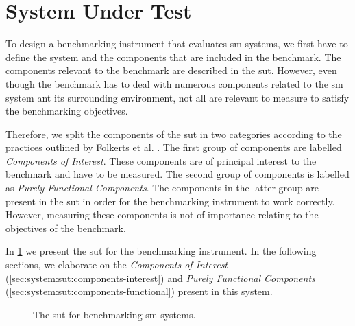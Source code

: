 \section{System Under Test}
\label{sec:system:sut}

To design a benchmarking instrument that evaluates \gls{sm} systems, we first have to define the system and the components that are included in the benchmark. The components relevant to the benchmark are described in the \gls{sut}. However, even though the benchmark has to deal with numerous components related to the \gls{sm} system ant its surrounding environment, not all are relevant to measure to satisfy the benchmarking objectives.

Therefore, we split the components of the \gls{sut} in two categories according to the practices outlined by Folkerts et al. \cite{folkerts2012benchmarking}. The first group of components are labelled \textit{Components of Interest}. These components are of principal interest to the benchmark and have to be measured. The second group of components is labelled as \textit{Purely Functional Components}. The components in the latter group are present in the \gls{sut} in order for the benchmarking instrument to work correctly. However, measuring these components is not of importance relating to the objectives of the benchmark.

In \cref{fig:sut} we present the \gls{sut} for the benchmarking instrument. In the following sections, we elaborate on the  \textit{Components of Interest} (\cref{sec:system:sut:components-interest}) and \textit{Purely Functional Components} (\cref{sec:system:sut:components-functional})  present in this system.

\begin{figure}[!t]
    \centering
    
    
    \caption[Overview of the \gls{sut}.]{The \gls{sut} for benchmarking \gls{sm} systems.}
    
    \label{fig:sut}
\end{figure}

